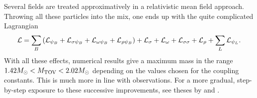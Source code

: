 Several fields are treated approximatively in a relativistic mean field approach.
Throwing all these particles into the mix, one ends up with the quite complicated Lagrangian
\begin{equation}
\begin{split}
	\mathcal{L} &= \sum_B \left( \mathcal{L}_{\psi_B} + \mathcal{L}_{\sigma \psi_{B}} + \mathcal{L}_{\omega \psi_{B}} + \mathcal{L}_{\rho \psi_{B}} \right) + \mathcal{L}_\sigma + \mathcal{L}_\omega + \mathcal{L}_{\sigma \sigma} + \mathcal{L}_\rho + \sum_L \mathcal{L}_{\psi_L} . \\
\end{split}
\end{equation}
With all these effects, numerical results give a maximum mass in the range $1.42 M_\odot < M_\text{TOV} < 2.02 M_\odot$ depending on the values chosen for the coupling constants. \cite[table 1]{ref:neutron_star_hyperon_effect}
This is much more in line with observations.
For a more gradual, step-by-step exposure to these successive improvements, see theses by \cite{ref:master_caroline} and \cite{ref:master_francesco}.

\iffalse
\subsubsection{Charge neutrality}

Multiple particles may in general have charge, in contrast to neutrons.
Stars are neutral: if it is charged, then particles of the same signed charge as the star are kicked out due to strong Coulomb force relative to weak gravitational force (can show quantitatively).
This argument means \emph{global} charge neutrality, but it is more common, easier and has little effect to instead assume \emph{local} charge neutrality.
\fi

